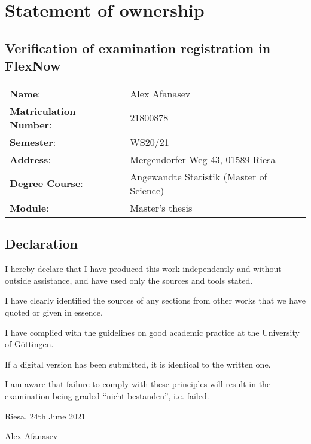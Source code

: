 \chapter*{Statement of ownership}

\section*{Verification of examination registration in FlexNow}

\begin{tabular}{ll}
\textbf{Name}: & Alex Afanasev \\
\textbf{Matriculation Number}: & 21800878 \\
\textbf{Semester}: & WS20/21 \\
\textbf{Address}: & Mergendorfer Weg 43, 01589 Riesa \\
\textbf{Degree Course}: & Angewandte Statistik (Master of Science) \\
\textbf{Module}: & Master's thesis
\end{tabular}

\section*{Declaration}

I hereby declare that I have produced this work independently and without
outside assistance, and have used only the sources and tools stated.

I have clearly identified the sources of any sections from other works that we
have quoted or given in essence.

I have complied with the guidelines on good academic practice at the University of Göttingen.

If a digital version has been submitted, it is identical to the written one.

I am aware that failure to comply with these principles will result in the examination being graded “nicht bestanden”, i.e. failed.


Riesa, 24th June 2021

Alex Afanasev
